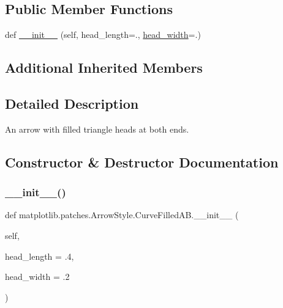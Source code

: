 \subsection*{Public Member Functions}
\begin{DoxyCompactItemize}
\item 
def \hyperlink{classmatplotlib_1_1patches_1_1ArrowStyle_1_1CurveFilledAB_a4463c407dcb9bf2a26dbb14442b0e87c}{\+\_\+\+\_\+init\+\_\+\+\_\+} (self, head\+\_\+length=., \hyperlink{classmatplotlib_1_1patches_1_1ArrowStyle_1_1__Curve_a360e40f4780784399d97fd36b8569ab7}{head\+\_\+width}=.)
\end{DoxyCompactItemize}
\subsection*{Additional Inherited Members}


\subsection{Detailed Description}
\begin{DoxyVerb}An arrow with filled triangle heads at both ends.\end{DoxyVerb}
 

\subsection{Constructor \& Destructor Documentation}
\mbox{\label{classmatplotlib_1_1patches_1_1ArrowStyle_1_1CurveFilledAB_a4463c407dcb9bf2a26dbb14442b0e87c}} 
\subsubsection{\texorpdfstring{\+\_\+\+\_\+init\+\_\+\+\_\+()}{\_\_init\_\_()}}
{\footnotesize\ttfamily def matplotlib.\+patches.\+Arrow\+Style.\+Curve\+Filled\+A\+B.\+\_\+\+\_\+init\+\_\+\+\_\+ (\begin{DoxyParamCaption}\item[{}]{self,  }\item[{}]{head\+\_\+length = {\ttfamily .4},  }\item[{}]{head\+\_\+width = {\ttfamily .2} }\end{DoxyParamCaption})}

